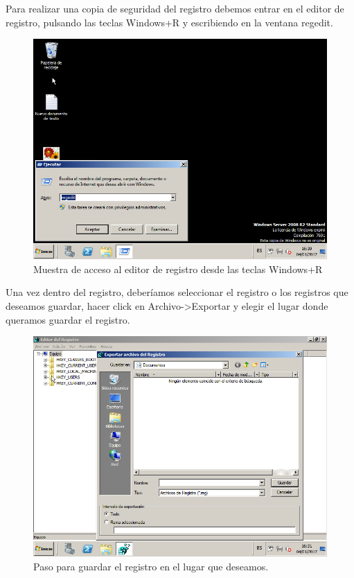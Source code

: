 Para realizar una copia de seguridad del registro debemos entrar en el editor de registro, pulsando las teclas Windows+R y escribiendo en la ventana regedit.

\begin{figure}[H] %
	\centering
	\includegraphics[scale=0.5]{imagenes/regedit.png}  %
	\caption{Muestra de acceso al editor de registro desde las teclas Windows+R} \label{fig:figura6}
\end{figure}

Una vez dentro del registro, deberíamos seleccionar el registro o los registros que deseamos guardar, hacer click en Archivo->Exportar y elegir el lugar donde queramos guardar el registro.

\begin{figure}[H] %
	\centering
	\includegraphics[scale=0.5]{imagenes/exportar.png}  %
	\caption{Paso para guardar el registro en el lugar que deseamos.} \label{fig:figura7}
\end{figure}



